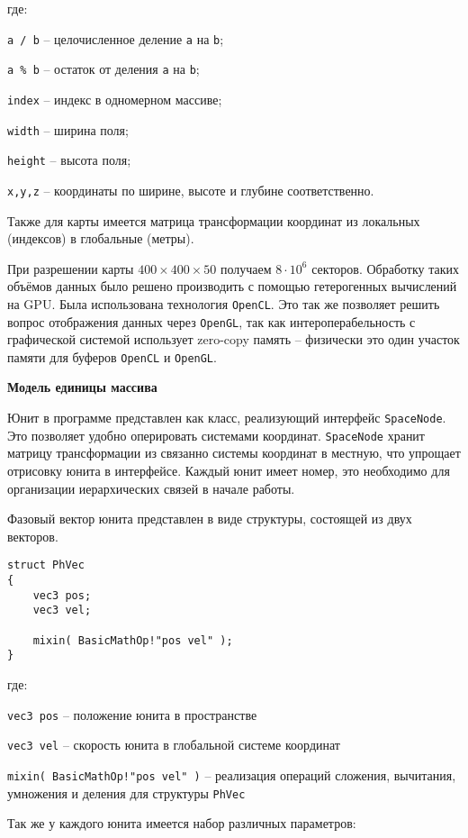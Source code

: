 где:

\verb|a / b| -- целочисленное деление \verb|a| на \verb|b|;

\verb|a % b| -- остаток от деления \verb|a| на \verb|b|;

\verb|index| -- индекс в одномерном массиве;

\verb|width| -- ширина поля;

\verb|height| -- высота поля;

\verb|x,y,z| -- координаты по ширине, высоте и глубине соответственно.

Также для карты имеется матрица трансформации координат из локальных (индексов)
в глобальные (метры).

При разрешении карты $400 \times 400 \times 50$ получаем $8 \cdot 10^6$ секторов.
Обработку таких объёмов данных было решено производить с помощью гетерогенных 
вычислений на GPU. Была использована технология \verb|OpenCL|. Это так же 
позволяет решить вопрос отображения данных через \verb|OpenGL|, так как
интероперабельность с графической системой использует zero-copy память -- 
физически это один участок памяти для буферов \verb|OpenCL| и \verb|OpenGL|.

\newpage
\textbf{Модель единицы массива}

Юнит в программе представлен как класс, реализующий интерфейс \verb|SpaceNode|.
Это позволяет удобно оперировать системами координат. \verb|SpaceNode| хранит
матрицу трансформации из связанно системы координат в местную, что упрощает
отрисовку юнита в интерфейсе. Каждый юнит имеет номер, это необходимо для
организации иерархических связей в начале работы.

Фазовый вектор юнита представлен в виде структуры, состоящей из двух векторов.

\begin{verbatim}
struct PhVec
{
    vec3 pos;
    vec3 vel;

    mixin( BasicMathOp!"pos vel" );
}
\end{verbatim}

где: 

\verb|vec3 pos| -- положение юнита в пространстве

\verb|vec3 vel| -- скорость юнита в глобальной системе координат

\verb|mixin( BasicMathOp!"pos vel" )| -- реализация операций сложения,
вычитания, умножения и деления для структуры \verb|PhVec| 

Так же
у каждого юнита имеется набор различных параметров:

